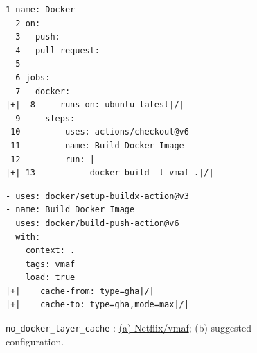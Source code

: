 \begin{figure}[htbp]
\centering
\begin{lstlisting}[style=ccscase]
  1 name: Docker
  2 on:
  3   push:
  4   pull_request:
  5 
  6 jobs:
  7   docker:
|+|  8     runs-on: ubuntu-latest|/|
  9     steps:
 10       - uses: actions/checkout@v6
 11       - name: Build Docker Image
 12         run: |
|+| 13           docker build -t vmaf .|/|
\end{lstlisting}
\par{}
\begin{lstlisting}[style=ccscase,aboveskip=2pt,belowskip=3pt]
- uses: docker/setup-buildx-action@v3
- name: Build Docker Image
  uses: docker/build-push-action@v6
  with:
    context: .
    tags: vmaf
    load: true
|+|    cache-from: type=gha|/|
|+|    cache-to: type=gha,mode=max|/|
\end{lstlisting}
\par{}
\caption{\texttt{no\_docker\_layer\_cache} : \href{https://github.com/Netflix/vmaf/blob/30f472b146b9228f76c684360d6a976774290b5e/.github/workflows/docker.yml}{(a) Netflix/vmaf}; (b) suggested configuration.}
\label{fig:ccs-docker-layer-code}
\end{figure}
